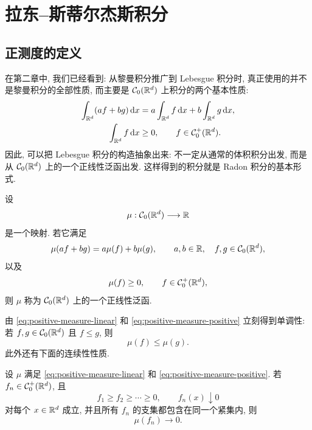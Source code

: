 \chapter{拉东--斯蒂尔杰斯积分}

\section{正测度的定义}
\label{sec:positive-radon-measures}

在第二章中, 我们已经看到: 从黎曼积分推广到 Lebesgue 积分时, 真正使用的并不是黎曼积分的全部性质, 而主要是 \(\mathcal{C}_0(\mathbb{R}^d)\) 上积分的两个基本性质:
\begin{align}
	\int_{\mathbb{R}^d}(af+bg)\,\dd x
	&=a\int_{\mathbb{R}^d}f\,\dd x+b\int_{\mathbb{R}^d}g\,\dd x,\label{eq:lebesgue-basic-linear}\\
	\int_{\mathbb{R}^d}f\,\dd x&\geq0,\qquad f\in\mathcal{C}_0^+(\mathbb{R}^d).\label{eq:lebesgue-basic-positive}
\end{align}
因此, 可以把 Lebesgue 积分的构造抽象出来: 不一定从通常的体积积分出发, 而是从 \(\mathcal{C}_0(\mathbb{R}^d)\) 上的一个正线性泛函出发. 这样得到的积分就是 Radon 积分的基本形式.

设
\[
\mu:\mathcal{C}_0(\mathbb{R}^d)\longrightarrow\mathbb{R}
\]
是一个映射. 若它满足
\begin{equation}
	\mu(af+bg)=a\mu(f)+b\mu(g),
	\qquad a,b\in\mathbb{R},\quad f,g\in\mathcal{C}_0(\mathbb{R}^d),
	\label{eq:positive-measure-linear}
\end{equation}
以及
\begin{equation}
	\mu(f)\geq0,
	\qquad f\in\mathcal{C}_0^+(\mathbb{R}^d),
	\label{eq:positive-measure-positive}
\end{equation}
则 \(\mu\) 称为 \(\mathcal{C}_0(\mathbb{R}^d)\) 上的一个正线性泛函.

由 \eqref{eq:positive-measure-linear} 和 \eqref{eq:positive-measure-positive} 立刻得到单调性: 若 \(f,g\in\mathcal{C}_0(\mathbb{R}^d)\) 且 \(f\leq g\), 则
\[
\mu(f)\leq \mu(g).
\]
此外还有下面的连续性性质.

\begin{lem}\label{lem:positive-functional-continuity-from-above}
	设 \(\mu\) 满足 \eqref{eq:positive-measure-linear} 和 \eqref{eq:positive-measure-positive}. 若 \(f_n\in\mathcal{C}_0^+(\mathbb{R}^d)\), 且
	\[
	f_1\geq f_2\geq\cdots\geq0,
	\qquad
	f_n(x)\downarrow0
	\]
	对每个 \(x\in\mathbb{R}^d\) 成立, 并且所有 \(f_n\) 的支集都包含在同一个紧集内, 则
	\begin{equation}
		\mu(f_n)\longrightarrow0.
		\label{eq:positive-functional-continuity-from-above}
	\end{equation}
\end{lem}

